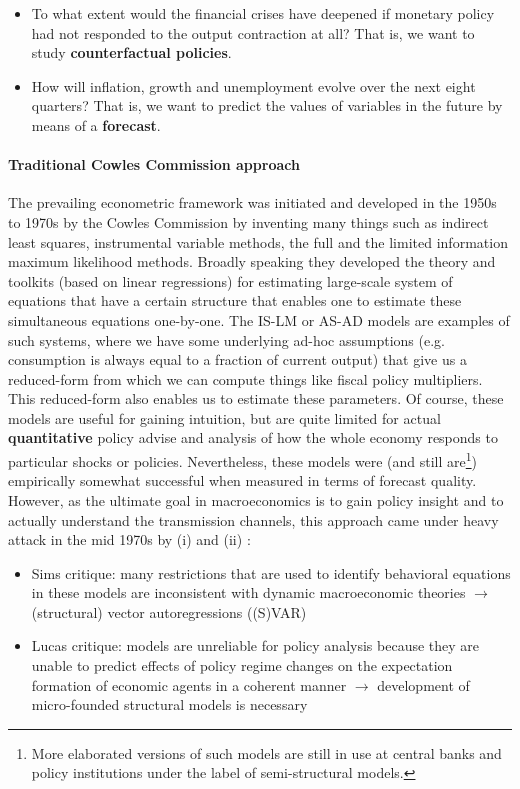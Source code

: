 \begin{itemize}
  \item To what extent would the financial crises have deepened if monetary policy had not responded to the output contraction at all?
  That is, we want to study \textbf{counterfactual policies}.
  \item How will inflation, growth and unemployment evolve over the next eight quarters?
  That is, we want to predict the values of variables in the future by means of a \textbf{forecast}.  
\end{itemize}

\paragraph*{Traditional Cowles Commission approach}
The prevailing econometric framework was initiated and developed in the 1950s to 1970s by the Cowles Commission by inventing
  many things such as indirect least squares, instrumental variable methods, the full and the limited information maximum likelihood methods.
Broadly speaking they developed the theory and toolkits (based on linear regressions) for estimating large-scale system of equations
  that have a certain structure that enables one to estimate these simultaneous equations one-by-one.
The IS-LM or AS-AD models are examples of such systems,
  where we have some underlying ad-hoc assumptions (e.g. consumption is always equal to a fraction of current output)
  that give us a reduced-form from which we can compute things like fiscal policy multipliers.
This reduced-form also enables us to estimate these parameters.
Of course, these models are useful for gaining intuition,
  but are quite limited for actual \textbf{quantitative} policy advise
  and analysis of how the whole economy responds to particular shocks or policies.
Nevertheless, these models were (and still are\footnote{
  More elaborated versions of such models are still in use at central banks and policy institutions under the label of semi-structural models.})
  empirically somewhat successful when measured in terms of forecast quality.
However, as the ultimate goal in macroeconomics is to gain policy insight and to actually understand the transmission channels,
  this approach came under heavy attack in the mid 1970s by (i) \textcite{Lucas_1976_EconometricPolicyEvaluation} and (ii) \textcite{Sims_1980_MacroeconomicsReality}:
\begin{itemize}
  \item Sims critique: many restrictions that are used to identify behavioral equations in these models are inconsistent with dynamic macroeconomic theories
  $\rightarrow$ (structural) vector autoregressions ((S)VAR)
  \item Lucas critique: models are unreliable for policy analysis
  because they are unable to predict effects of policy regime changes on the expectation formation of economic agents in a coherent manner
  $\rightarrow$ development of micro-founded structural models is necessary
\end{itemize}

